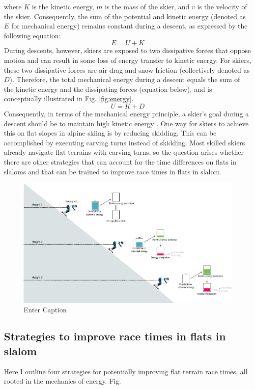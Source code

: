 where $K$ is the kinetic energy, $m$ is the mass of the skier, and $v$ is the velocity of the skier. Consequently, the sum of the potential and kinetic energy  (denoted as $E$ for mechanical energy) remains constant during a descent, as expressed by the following equation:
\[ E = U + K \]
During descents, however, skiers are exposed to two dissipative forces that oppose motion and can result in some loss of energy transfer to kinetic energy. For skiers, these two dissipative forces are air drag and snow friction (collectively denoted as $D$)\cite{supej_differential_2008}. Therefore, the total mechanical energy during a descent equals the sum of the kinetic energy and the dissipating forces (equation below), and is conceptually illustrated in Fig. \ref{fig:energy}.
\[ U = K + D\]
Consequently, in terms of the mechanical energy principle, a skier's goal during a descent should be to maintain high kinetic energy \cite{supej_differential_2008, supej_mechanical_2011, supej_how_2010}. One way for skiers to achieve this on flat slopes in alpine skiing is by reducing skidding\cite{reid_kinematic_2010, reid_turn_2009}. This can be accomplished by executing carving turns instead of skidding. Most skilled skiers already navigate flat terrains with carving turns, so the question arises whether there are other strategies that can account for the time differences on flats in slaloms and that can be trained to improve race times in flats in slalom.  


\begin{figure}
    \centering
    \includegraphics[width=1\linewidth]{figure/figure_introduction_mechenergy.pdf}
    \caption{Enter Caption}
    \label{fig: energy}
\end{figure}




\subsection{Strategies to improve race times in flats in slalom}
Here I outline four strategies for potentially improving flat terrain race times, all rooted in the mechanics of energy. Fig. 

